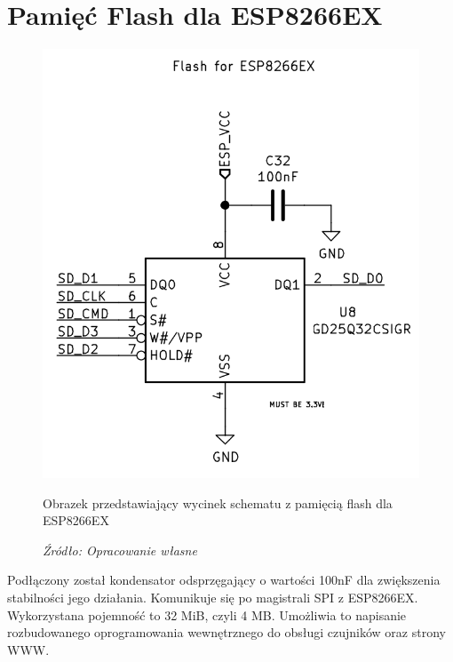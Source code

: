\documentclass[12pt,a4paper,oneside]{memoir}
\begin{document}
\section{Pamięć Flash dla ESP8266EX}
\begin{figure}[!h]
	\centering
	\includegraphics[scale=0.2]{images/sch/sch-10.png}
	{\tytulyrozdzialow \footnotesize \caption[Schemat - pamięć flash] {Obrazek przedstawiający wycinek schematu z pamięcią flash dla ESP8266EX}}
	\caption*{\textit{Źródło: Opracowanie własne}}
\end{figure}
\par Podłączony został kondensator odsprzęgający o wartości 100nF dla zwiększenia stabilności jego działania. Komunikuje się po magistrali SPI z ESP8266EX. Wykorzystana pojemność to 32 MiB, czyli 4 MB. Umożliwia to napisanie rozbudowanego oprogramowania wewnętrznego do obsługi czujników oraz strony WWW.
\end{document}
